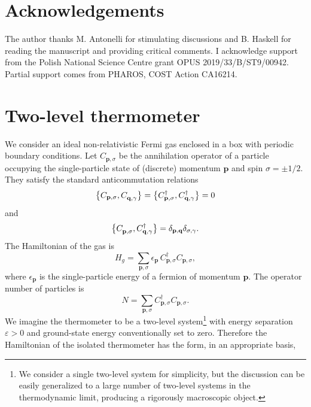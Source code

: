 \documentclass[twocolumn,usenatbib]{mnras2}
\newcommand{\vect}[1]{\mathbf{{#1}}}
\begin{document}
\section*{Acknowledgements}

 The author thanks M. Antonelli for stimulating discussions and B. Haskell for reading the manuscript and providing critical comments. I acknowledge support from the Polish National Science Centre grant OPUS 2019/33/B/ST9/00942. Partial support comes from PHAROS, COST Action CA16214.


\appendix

\section{Two-level thermometer}\label{2LT}

We consider an ideal non-relativistic Fermi gas enclosed in a box with periodic boundary conditions. Let $C_{\vect{p},\sigma}$ be the annihilation operator of a particle occupying the single-particle state of (discrete) momentum $\vect{p}$ and spin $\sigma=\pm 1/2$. They satisfy the standard anticommutation relations
\begin{equation}
\acomm{ C_{\vect{p},\sigma}}{  C_{\vect{q},\gamma}^{\textcolor{white}{\dagger}} } = \acomm{ C^\dagger_{\vect{p},\sigma}}{  C^\dagger_{\vect{q},\gamma} } = 0
\end{equation}
and
\begin{equation}
\acomm{ C^{\textcolor{white}{\dagger}}_{\vect{p},\sigma}}{  C^\dagger_{\vect{q},\gamma} }  = \delta_{\vect{p},\vect{q}} \delta_{\sigma,\gamma}.
\end{equation}
The Hamiltonian of the gas is
\begin{equation}
H_g = \sum_{\vect{p},\sigma} \epsilon_{\vect{p}} \, C^\dagger_{\vect{p},\sigma}C_{\vect{p},\sigma},
\end{equation}
where $\epsilon_{\vect{p}}$ is the single-particle energy of a fermion of momentum $\vect{p}$. The operator number of particles is
\begin{equation}
N = \sum_{\vect{p},\sigma} C^\dagger_{\vect{p},\sigma} C_{\vect{p},\sigma}.
\end{equation}
We imagine the thermometer to be a two-level system\footnote{We consider a single two-level system for simplicity, but the discussion can be easily generalized to a large number of two-level systems in the thermodynamic limit, producing a rigorously macroscopic object.} with energy separation $\varepsilon>0$ and ground-state energy conventionally set to zero. Therefore the Hamiltonian of the isolated thermometer has the form, in an appropriate basis,
\end{document}
